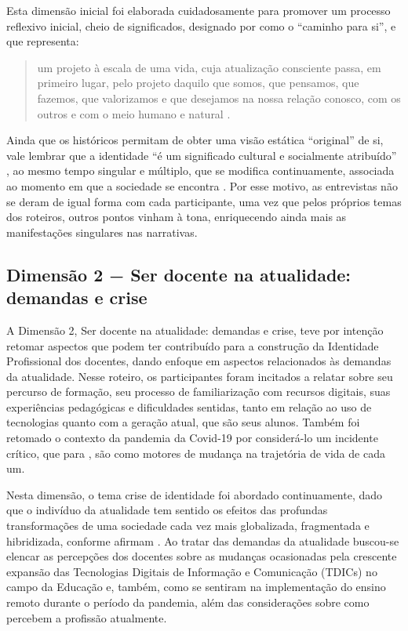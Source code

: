 \documentclass[portuguese]{textolivre}
\begin{document}
Esta dimensão inicial foi elaborada cuidadosamente para promover um processo reflexivo inicial, cheio de significados, designado por \textcite{josso2004} como o “caminho para si”, e que representa:

\begin{quote}
    um projeto à escala de uma vida, cuja atualização consciente passa, em primeiro lugar, pelo projeto daquilo que somos, que pensamos, que fazemos, que valorizamos e que desejamos na nossa relação conosco, com os outros e com o meio humano e natural \cite[p.~43]{josso2004}.
\end{quote}

Ainda que os históricos permitam de obter uma visão estática “original” de si, vale lembrar que a identidade “é um significado cultural e socialmente atribuído” \cite[p.~89]{silva2020}, ao mesmo tempo singular e múltiplo, que se modifica continuamente, associada ao momento em que a sociedade se encontra \cite{bauman2021,hall2000,hall2020}. Por esse motivo, as entrevistas não se deram de igual forma com cada participante, uma vez que pelos próprios temas dos roteiros, outros pontos vinham à tona, enriquecendo ainda mais as manifestações singulares nas narrativas.

\subsection{Dimensão 2 − Ser docente na atualidade: demandas e crise}\label{sec-modelo}
A Dimensão 2, Ser docente na atualidade: demandas e crise, teve por intenção retomar aspectos que podem ter contribuído para a construção da Identidade Profissional dos docentes, dando enfoque em aspectos relacionados às demandas da atualidade. Nesse roteiro, os participantes foram incitados a relatar sobre seu percurso de formação, seu processo de familiarização com recursos digitais, suas experiências pedagógicas e dificuldades sentidas, tanto em relação ao uso de tecnologias quanto com a geração atual, que são seus alunos. Também foi retomado o contexto da pandemia da Covid-19 por considerá-lo um incidente crítico, que para \textcite{bolivar2006}, são como motores de mudança na trajetória de vida de cada um.

Nesta dimensão, o tema crise de identidade \cite{dubar2009,hall2020} foi abordado continuamente, dado que o indivíduo da atualidade tem sentido os efeitos das profundas transformações de uma sociedade cada vez mais globalizada, fragmentada e hibridizada, conforme afirmam \textcite{giddens2002,bauman2021}. Ao tratar das demandas da atualidade buscou-se elencar as percepções dos docentes sobre as mudanças ocasionadas pela crescente expansão das Tecnologias Digitais de Informação e Comunicação (TDICs) no campo da Educação e, também, como se sentiram na implementação do ensino remoto durante o período da pandemia, além das considerações sobre como percebem a profissão atualmente.
\end{document}
